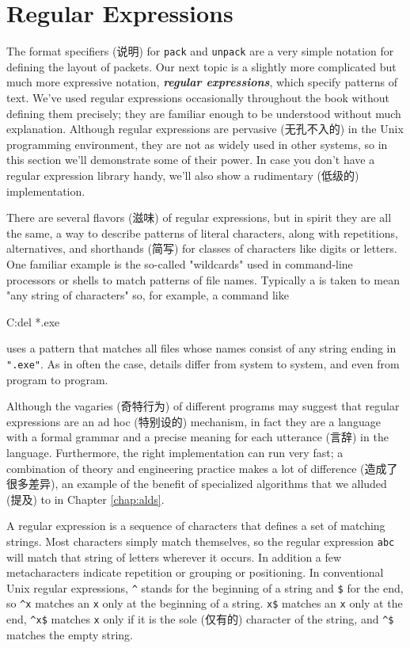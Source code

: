 \section{Regular Expressions}
\label{sec:regular_expressions}

The format specifiers (说明) for \verb'pack' and \verb'unpack' are a very
simple notation for defining the layout of packets. Our next topic is a
slightly more complicated but much more expressive notation,
\textbf{\textit{regular expressions}}, which specify patterns of text.
We've used regular expressions occasionally throughout the book without
defining them precisely; they are familiar enough to be understood without
much explanation.  Although regular expressions are pervasive (无孔不入的)
in the Unix programming environment, they are not as widely used in other
systems, so in this section we'll demonstrate some of their power. In case
you don't have a regular expression library handy, we'll also show a
rudimentary (低级的) implementation.

There are several flavors (滋味) of regular expressions, but in spirit they
are all the same, a way to describe patterns of literal characters, along
with repetitions, alternatives, and shorthands (简写) for classes of
characters like digits or letters. One familiar example is the so-called
"wildcards" used in command-line processors or shells to match patterns of
file names. Typically a is taken to mean "any string of characters" so, for
example, a command like
\begin{wellcode}
    C:\>del *.exe
\end{wellcode}
uses a pattern that matches all files whose names consist of any string
ending in \verb'".exe"'. As in often the case, details differ from system
to system, and even from program to program.

Although the vagaries (奇特行为) of different programs may suggest that
regular expressions are an ad hoc (特别设的) mechanism, in fact they are a
language with a formal grammar and a precise meaning for each utterance
(言辞) in the language. Furthermore, the right implementation can run very
fast; a combination of theory and engineering practice makes a lot of
difference (造成了很多差异), an example of the benefit of specialized
algorithms that we alluded (提及) to in Chapter \ref{chap:alds}.

A regular expression is a sequence of characters that defines a set of
matching strings. Most characters simply match themselves, so the regular
expression \verb'abc' will match that string of letters wherever it occurs.
In addition a few metacharacters indicate repetition or grouping or
positioning. In conventional Unix regular expressions, \verb'^' stands for
the beginning of a string and \verb'$' for the end, so \verb'^x' matches an
\verb'x' only at the beginning of a string. \verb'x$' matches an \verb'x'
only at the end, \verb'^x$' matches \verb'x' only if it is the sole
(仅有的) character of the string, and \verb'^$' matches the empty string.

